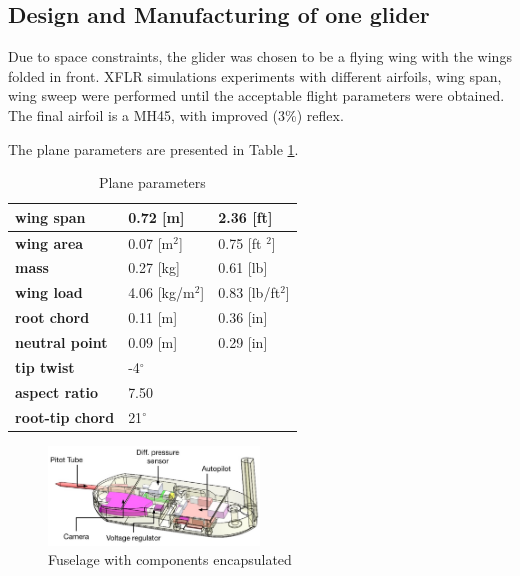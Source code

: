 \subsection{Design and Manufacturing of one glider}

Due to space constraints, the glider was chosen to be a flying wing with the wings folded in front. XFLR simulations experiments with different airfoils, wing span, wing sweep were performed until the acceptable flight parameters were obtained. The final airfoil is a MH45, with improved (3\%) reflex.

The plane parameters are presented in Table \ref{plane_param}.

\begin{table}[h!]
\centering
\begin{tabular}{|l|l|l|}
\hline
\textbf{wing span}      & 0.72 {[}m{]}        & 2.36 {[}ft{]}        \\ \hline
\textbf{wing area}      & 0.07 {[}m$^2${]}    & 0.75 {[}ft $^2${]}   \\ \hline
\textbf{mass}           & 0.27 {[}kg{]}       & 0.61 {[}lb{]}        \\ \hline
\textbf{wing load}      & 4.06 {[}kg/m$^2${]} & 0.83 {[}lb/ft$^2${]} \\ \hline
\textbf{root chord}     & 0.11 {[}m{]}        & 0.36 {[}in{]}        \\ \hline
\textbf{neutral point}  & 0.09 {[}m{]}        & 0.29 {[}in{]}        \\ \hline
\textbf{tip twist}      & -4$^\circ$        &                      \\ \hline
\textbf{aspect ratio}   & 7.50                &                      \\ \hline
\textbf{root-tip chord} & 21$^\circ$        &                      \\ \hline
\end{tabular}
\caption{Plane parameters}
\label{plane_param}
\end{table}

\begin{figure}[h!]
    \centering
        \includegraphics[width=0.5\textwidth]{img/fuselage.jpg}
        \caption{Fuselage with components encapsulated}
        \label{f:fuseg}
 \end{figure}

